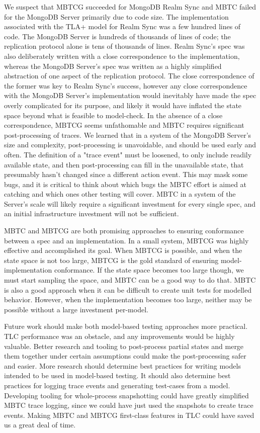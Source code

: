\documentclass{vldb}
\begin{document}
We suspect that MBTCG succeeded for MongoDB Realm Sync and MBTC failed for the MongoDB Server primarily due to code size. 
The implementation associated with the TLA+ model for Realm Sync was a few hundred lines of code. 
The MongoDB Server is hundreds of thousands of lines of code; the replication protocol alone is tens of thousands of lines.
Realm Sync's spec was also deliberately written with a close correspondence to the implementation, whereas the MongoDB Server's spec was written as a highly simplified abstraction of one aspect of the replication protocol.
The close correspondence of the former was key to Realm Sync's success, however any close correspondence with the MongoDB Server's implementation would inevitably have made the spec overly complicated for its purpose, and likely it would have inflated the state space beyond what is feasible to model-check.
In the absence of a close correspondence, MBTCG seems unfathomable and MBTC requires significant post-processing of traces. 
We learned that in a system of the MongoDB Server's size and complexity, post-processing is unavoidable, and should be used early and often.
The definition of a "trace event" must be loosened, to only include readily available state, and then post-processing can fill in the unavailable state, that presumably hasn't changed since a different action event.
This may mask some bugs, and it is critical to think about which bugs the MBTC effort is aimed at catching and which ones other testing will cover.
MBTC in a system of the Server's scale will likely require a significant investment for every single spec, and an initial infrastructure investment will not be sufficient.

MBTC and MBTCG are both promising approaches to ensuring conformance between a spec and an implementation.
In a small system, MBTCG was highly effective and accomplished its goal. When MBTCG is possible, and when the state space is not too large, MBTCG is the gold standard of ensuring model-implementation conformance.
If the state space becomes too large though, we must start sampling the space, and MBTC can be a good way to do that.
MBTC is also a good approach when it can be difficult to create unit tests for modelled behavior.
However, when the implementation becomes too large, neither may be possible without a large investment per-model.

Future work should make both model-based testing approaches more practical.
TLC performance was an obstacle, and any improvements would be highly valuable.
Better research and tooling to post-process partial states and merge them together under certain assumptions could make the post-processing safer and easier.
More research should determine best practices for writing models intended to be used in model-based testing.
It should also determine best practices for logging trace events and generating test-cases from a model.
Developing tooling for whole-process snapshotting could have greatly simplified MBTC trace logging, since we could have just used the snapshots to create trace events.
Making MBTC and MBTCG first-class features in TLC could have saved us a great deal of time.
\end{document}
